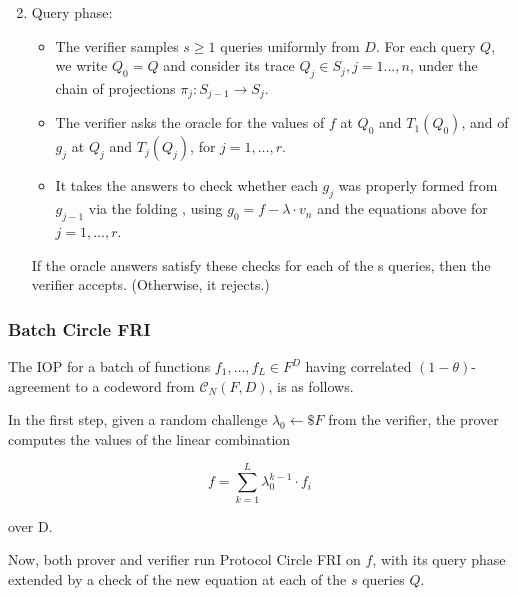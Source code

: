\documentclass{beamer}
\begin{document}
\begin{frame}
	\begin{enumerate}
	 \setcounter{enumi}{1}
		\item
	 Query phase: 
	 \begin{itemize}
	 	\item The verifier samples $s \geq 1$ queries uniformly from $D$. For each query $Q$, we write $Q_0=Q$ and consider its trace $Q_j \in S_j, j=1 \ldots, n$, under the chain of projections $\pi_j: S_{j-1} \longrightarrow S_j$. 

		\item  The verifier asks the oracle for the values of $f$ at $Q_0$ and $T_1\left(Q_0\right)$, and of $g_j$ at $Q_j$ and $T_j\left(Q_j\right)$, for $j=1, \ldots, r$. 
		\item It takes the answers to check whether each $g_j$ was properly formed from $g_{j-1}$ via the folding , using $g_0=f-\lambda \cdot v_n$ and the equations above for $j=1, \ldots, r$.
	 \end{itemize}
	 	 
	
	 
	 

If the oracle answers satisfy these checks for each of the s queries, then the verifier accepts. (Otherwise, it rejects.)

	\end{enumerate}
\end{frame}

\begin{frame}
\frametitle{Batch Circle FRI}
The IOP for a batch of functions $f_1, \ldots, f_L \in F^D$ having correlated $(1-\theta)$-agreement to a codeword from $\mathcal{C}_N(F, D)$, is as follows. 

In the first step, given a random challenge $\lambda_0 \leftarrow \$ F$ from the verifier, the prover computes the values of the linear combination

$$
f=\sum_{k=1}^L \lambda_0^{k-1} \cdot f_i
$$

over D. 

Now, both prover and verifier run Protocol Circle FRI on $f$, with its query phase extended by a check of the new equation at each of the $s$ queries $Q$.
	
\end{frame}
\end{document}
